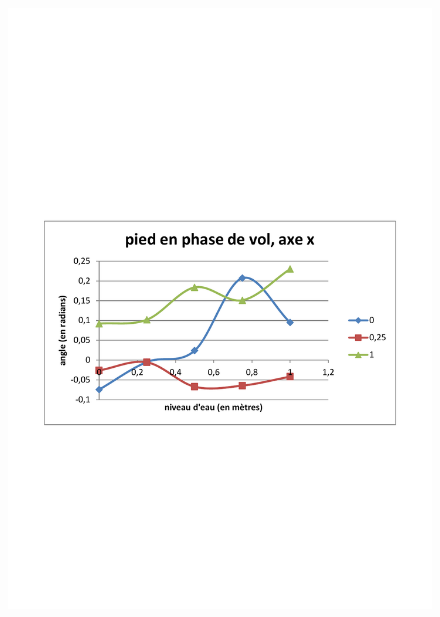 \documentclass[runningheads,a4paper]{llncs}
\begin{document}
\begin{figure}[h]
\includegraphics[scale=0.3]{traj_pts_clefs/swing_foot_x.pdf}

\end{figure}
\end{document}

